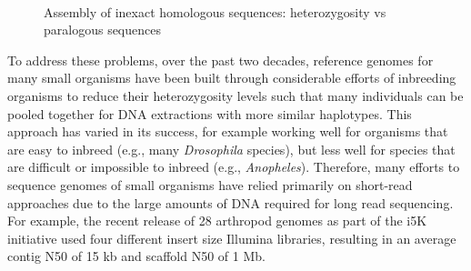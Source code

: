 \begin{figure}[htbp!]

\begin{centering}
\caption{Assembly of inexact homologous sequences: heterozygosity vs paralogous sequences}\label{figure:assembly}

 \\

\end{centering}
\end{figure}


\par{
To address these problems, over the past two decades, reference genomes for many small organisms have been built through considerable efforts of inbreeding organisms to reduce their heterozygosity levels such that many individuals can be pooled together for DNA extractions with more similar haplotypes. This approach has varied in its success, for example working well for organisms that are easy to inbreed (e.g., many \textit{Drosophila} species\cite{Drosophila_12_Genomes_Consortium2007-fx}), but less well for species that are difficult or impossible to inbreed (e.g., \textit{Anopheles}\cite{Neafsey2015-op}). Therefore, many efforts to sequence genomes of small organisms have relied primarily on short-read approaches due to the large amounts of DNA required for long read sequencing. For example, the recent release of 28 arthropod genomes as part of the i5K initiative used four different insert size Illumina libraries, resulting in an average contig N50 of 15 kb and scaffold N50 of 1 Mb\cite{Thomas2018-rk}.
} 

